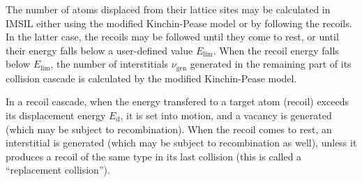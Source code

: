 The number of atoms displaced from their lattice sites may be calculated
in IMSIL either using the modified Kinchin-Pease model \cite{I7504} or by
following the recoils. In the latter case, the recoils may be followed 
until they come to rest, or until their energy falls below a user-defined
value $E_\mathrm{lim}$. When the recoil energy falls below $E_\mathrm{lim}$, the
number of interstitials $\nu_\mathrm{gen}$ generated in the remaining part of its 
collision cascade is calculated by the modified Kinchin-Pease model.

In a recoil cascade, when the energy transfered to a target atom (recoil)
exceeds its displacement energy $E_\mathrm{d}$, it is set into motion, and a
vacancy is generated (which may be subject to recombination). When the recoil
comes to rest, an interstitial is generated (which may be subject to
recombination as well), unless it produces a recoil of the same type in its last
collision (this is called a ``replacement collision'').  

